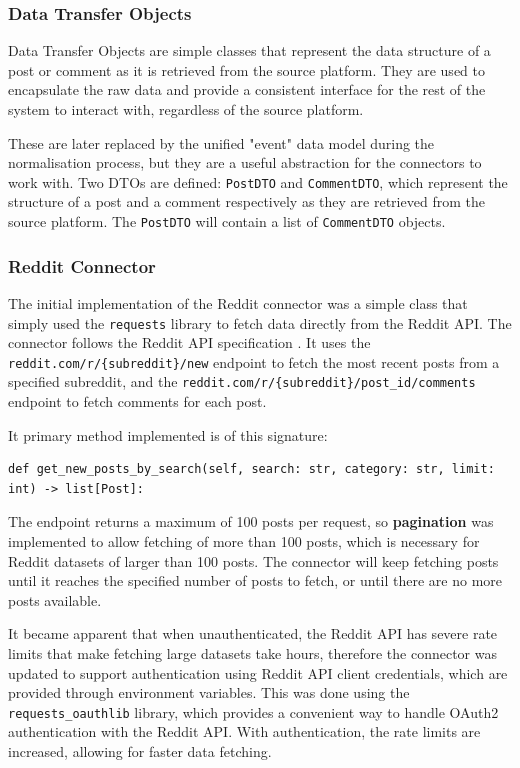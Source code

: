 \documentclass[12pt, a4paper]{article}
\begin{document}
\subsubsection{Data Transfer Objects}
Data Transfer Objects are simple classes that represent the data structure of a post or comment as it is retrieved from the source platform. They are used to encapsulate the raw data and provide a consistent interface for the rest of the system to interact with, regardless of the source platform.

These are later replaced by the unified "event" data model during the normalisation process, but they are a useful abstraction for the connectors to work with. Two DTOs are defined: \texttt{PostDTO} and \texttt{CommentDTO}, which represent the structure of a post and a comment respectively as they are retrieved from the source platform. The \texttt{PostDTO} will contain a list of \texttt{CommentDTO} objects.

\subsubsection{Reddit Connector}
The initial implementation of the Reddit connector was a simple class that simply used the \texttt{requests} library to fetch data directly from the Reddit API. The connector follows the Reddit API specification \cite{reddit_api}. It uses the \texttt{reddit.com/r/\{subreddit\}/new} endpoint to fetch the most recent posts from a specified subreddit, and the \texttt{reddit.com/r/\{subreddit\}/{post\_id}/comments} endpoint to fetch comments for each post.

It primary method implemented is of this signature:
\begin{Verbatim}[breaklines=true]
def get_new_posts_by_search(self, search: str, category: str, limit: int) -> list[Post]:
\end{Verbatim}

The endpoint returns a maximum of 100 posts per request, so \textbf{pagination} was implemented to allow fetching of more than 100 posts, which is necessary for Reddit datasets of larger than 100 posts. The connector will keep fetching posts until it reaches the specified number of posts to fetch, or until there are no more posts available.

It became apparent that when unauthenticated, the Reddit API has severe rate limits that make fetching large datasets take hours, therefore the connector was updated to support authentication using Reddit API client credentials, which are provided through environment variables. This was done using the \texttt{requests\_oauthlib} library, which provides a convenient way to handle OAuth2 authentication with the Reddit API. With authentication, the rate limits are increased, allowing for faster data fetching.
\end{document}
